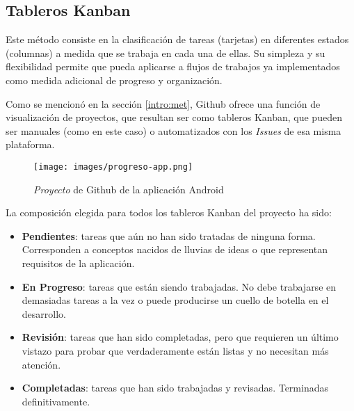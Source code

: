 
        \subsection{Tableros Kanban}

            Este método consiste en la clasificación de tareas (tarjetas) en diferentes estados (columnas) a medida que se trabaja en cada una de ellas. Su simpleza y su flexibilidad permite que pueda aplicarse a flujos de trabajos ya implementados como medida adicional de progreso y organización.

            Como se mencionó en la sección \ref{intro:met}, Github ofrece una función de visualización de proyectos, que resultan ser como tableros Kanban, que pueden ser manuales (como en este caso) o automatizados con los \textit{Issues} de esa misma plataforma.

            \begin{figure*}[h]

                \centering
                \texttt{[image: images/progreso-app.png]}
                \caption{\textit{Proyecto} de Github de la aplicación Android}

            \end{figure*}

            La composición elegida para todos los tableros Kanban del proyecto ha sido:

            \begin{itemize}

                \item \textbf{Pendientes}: tareas que aún no han sido tratadas de ninguna forma. Corresponden a conceptos nacidos de lluvias de ideas o que representan requisitos de la aplicación.

                \item \textbf{En Progreso}: tareas que están siendo trabajadas. No debe trabajarse en demasiadas tareas a la vez o puede producirse un cuello de botella en el desarrollo.

                \item \textbf{Revisión}: tareas que han sido completadas, pero que requieren un último vistazo para probar que verdaderamente están listas y no necesitan más atención.

                \item \textbf{Completadas}: tareas que han sido trabajadas y revisadas. Terminadas definitivamente.

            \end{itemize}

